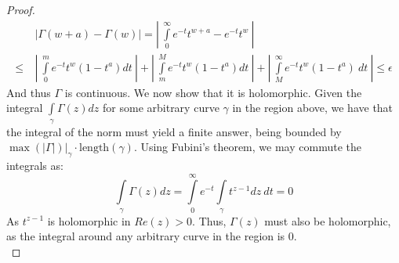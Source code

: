 \documentclass{article}
\begin{document}
\begin{proof}
\begin{align*}
    & |\Gamma(w+a) - \Gamma(w)| = \left| \ \int\limits_{0}^{\infty}e^{-t}t^{w+a} - e^{-t}t^{w} \ \right|  \\
    \leq \ & \left|\ \int\limits_{0}^{m}e^{-t}t^{w}(1-t^{a})dt \ \right| + \left| \ \int\limits_{m}^{M}e^{-t}t^{w}(1-t^{a}) dt \ \right| + \left| \ \int\limits_{M}^{\infty}e^{-t}t^{w}(1-t^{a}) \ dt \ \right| \leq \epsilon
  \end{align*}
  And thus $\Gamma$ is continuous. We now show that it is holomorphic. 
  Given the integral $\int\limits_{\gamma}\Gamma(z)dz$ for some arbitrary curve $\gamma$ in the region above, we have that the integral of the norm must yield a finite answer, being bounded by $\max(|\Gamma|)|_{\gamma} \cdot \text{length}(\gamma)$. Using Fubini's theorem, we may commute the integrals as:
  \[
    \int\limits_{\gamma}\Gamma(z)dz = \int\limits_{0}^{\infty}e^{-t}\int\limits_{\gamma}t^{z-1}dz \ dt = 0
  \]
  As $t^{z-1}$ is holomorphic in $Re(z) > 0$. Thus, $\Gamma(z)$ must also be holomorphic, as the integral around any arbitrary curve in the region is $0$. \\


\end{proof}
\end{document}

